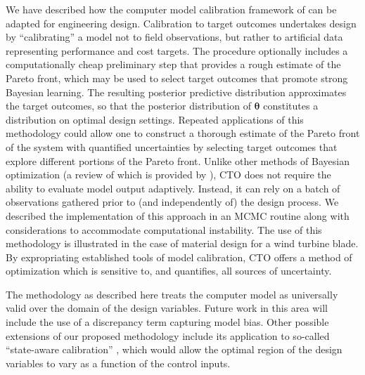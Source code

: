 \documentclass[twocolumn,10pt]{asme2ej}
\begin{document}
We have described how the 
computer model calibration framework of  \cite{Kennedy2001} can be adapted for engineering design. 
%
Calibration to target outcomes undertakes design by ``calibrating'' a model not to field observations, but rather to artificial data representing performance and cost targets. 
%
The procedure optionally includes a computationally cheap preliminary step that provides a rough estimate of the Pareto front, which may be used to select target outcomes that promote strong Bayesian learning.
%
The resulting posterior predictive distribution approximates the target outcomes, so that the posterior distribution of $\boldsymbol\theta$ constitutes a distribution on optimal design settings.
%
Repeated applications of this methodology could allow one to construct a thorough estimate of the Pareto front of the system with quantified uncertainties by selecting target outcomes that explore different portions of the Pareto front.
%
Unlike other methods of Bayesian optimization (a review of which is provided by \cite{Shahriari2016}), CTO does not require the ability to evaluate model output adaptively.
%
Instead, it can rely on a batch of observations gathered prior to (and independently of) the design process.
%
We described the implementation of this approach in an MCMC routine along with considerations to accommodate computational instability.
%
The use of this methodology is illustrated in the case of material design for a wind turbine blade. 
%
%
By expropriating established tools of model calibration, CTO offers a method of optimization which is sensitive to, and quantifies, all sources of uncertainty.
%

%
The methodology as described here treats the computer model as universally valid over the domain of the design variables. 
%
Future work in this area will include the use of a discrepancy term capturing model bias.
%
%
Other possible extensions of our proposed methodology include its application to so-called ``state-aware calibration'' \cite{Atamturktur2015,Stevens2018,Brown2016}, which would allow the optimal region of the design variables to vary as a function of the control inputs.
\end{document}
